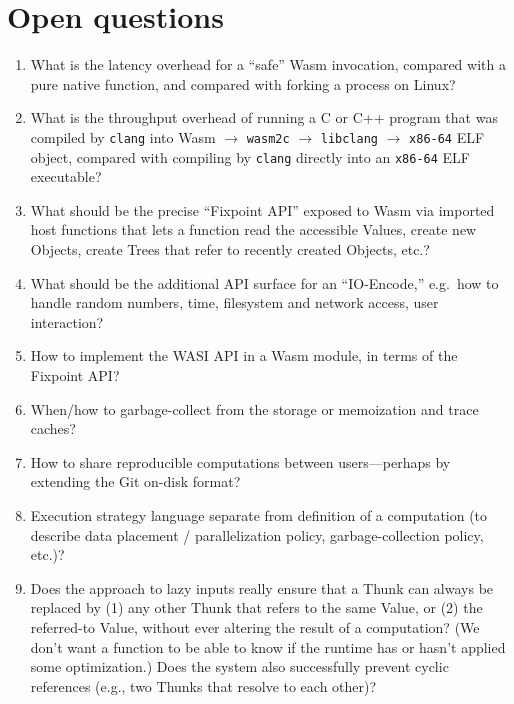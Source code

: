 \documentclass{article}
\newcommand{\valuex}{\textrm{Value}\xspace}
\newcommand{\valuexs}{\textrm{Value}s\xspace}
\newcommand{\objects}{\textrm{Object}s\xspace}
\newcommand{\thunk}{\textrm{Thunk}\xspace}
\newcommand{\thunks}{\textrm{Thunk}s\xspace}
\newcommand{\trees}{\textrm{Tree}s\xspace}
\begin{document}
\section{Open questions}

\begin{enumerate}[itemsep=0pt]
\item What is the latency overhead for a ``safe'' Wasm invocation, compared with a pure native function,
  and compared with forking a process on Linux?

\item What is the throughput overhead of running a C or C++ program
  that was compiled by \texttt{clang} into Wasm $\rightarrow$
  \texttt{wasm2c} $\rightarrow$ \texttt{libclang} $\rightarrow$
  \texttt{x86-64} ELF object, compared with compiling by \texttt{clang}
  directly into an \texttt{x86-64} ELF executable?

\item What should be the precise ``Fixpoint API'' exposed to Wasm via imported host functions that lets a function read the accessible \valuexs, create new \objects,
  create \trees that refer to recently created \objects, etc.?
  
\item What should be the additional API surface for an ``IO-Encode,'' e.g.~how to handle random numbers, time, filesystem and network access, user interaction?

\item How to implement the WASI API in a Wasm module, in terms of the Fixpoint API?
  
\item When/how to garbage-collect from the storage or memoization and trace caches?

\item How to share reproducible computations between users---perhaps by extending the Git on-disk format?
  
\item Execution strategy language separate from definition of a
  computation (to describe data placement / parallelization policy,
  garbage-collection policy, etc.)?
  
\item Does the approach to lazy inputs really ensure that a \thunk can
  always be replaced by (1) any other \thunk that refers to the same
  \valuex, or (2) the referred-to \valuex, without ever altering the
  result of a computation? (We don't want a function to be able to
  know if the runtime has or hasn't applied some optimization.) Does
  the system also successfully prevent cyclic references (e.g., two \thunks that resolve to
  each other)?


\end{enumerate}
\end{document}
